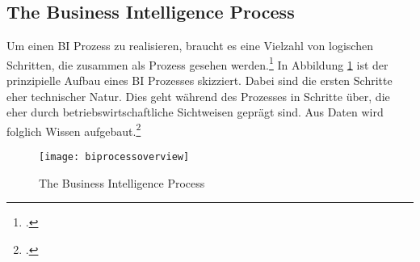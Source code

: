 \subsection{The Business Intelligence Process} \label{toc:prozess}

Um einen \ac{BI} Prozess zu realisieren, braucht es eine Vielzahl von logischen Schritten, die zusammen als Prozess gesehen
werden.\footcite[Cf.][p. 3]{foley2010business} In Abbildung \ref{figure:biprocessoverview} ist der prinzipielle Aufbau eines
\ac{BI} Prozesses skizziert. Dabei sind die ersten Schritte eher technischer Natur. Dies geht während des Prozesses in Schritte
über, die eher durch betriebswirtschaftliche Sichtweisen geprägt sind. Aus Daten wird folglich Wissen
aufgebaut.\footcite[Cf.][p. 13]{kasemsap2016fundamentals}

\begin{figure}[H]
    \caption{The Business Intelligence Process}
    \texttt{[image: biprocessoverview]}
    \label{figure:biprocessoverview}
    \\
    \cite[Source: Based on][Fig. 2]{foley2010business}
\end{figure}

